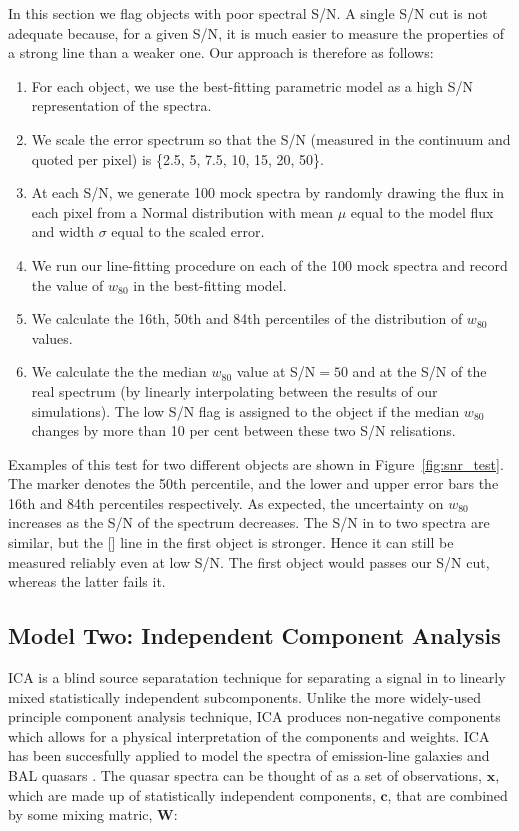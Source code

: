 In this section we flag objects with poor spectral \ac{S/N}. 
A single \ac{S/N} cut is not adequate because, for a given \ac{S/N}, it is much easier to measure the properties of a strong line than a weaker one. 
Our approach is therefore as follows:

\begin{enumerate}
\item For each object, we use the best-fitting parametric model as a high \ac{S/N} representation of the spectra. 
\item We scale the error spectrum so that the \ac{S/N} (measured in the continuum and quoted per pixel) is \{2.5, 5, 7.5, 10, 15, 20, 50\}.
\item At each \ac{S/N}, we generate 100 mock spectra by randomly drawing the flux in each pixel from a Normal distribution with mean $\mu$ equal to the model flux and width $\sigma$ equal to the scaled error. 
\item We run our line-fitting procedure on each of the 100 mock spectra and record the value of $w_{80}$ in the best-fitting model. 
\item We calculate the 16th, 50th and 84th percentiles of the distribution of $w_{80}$ values.
\item We calculate the the median $w_{80}$ value at \ac{S/N}$=50$ and at the \ac{S/N} of the real spectrum (by linearly interpolating between the results of our simulations). The low \ac{S/N} flag is assigned to the object if the median $w_{80}$ changes by more than 10 per cent between these two \ac{S/N} relisations. 
\end{enumerate}

Examples of this test for two different objects are shown in Figure~\ref{fig:snr_test}.
The marker denotes the 50th percentile, and the lower and upper error bars the 16th and 84th percentiles respectively. 
As expected, the uncertainty on $w_{80}$ increases as the \ac{S/N} of the spectrum decreases. 
The \ac{S/N} in to two spectra are similar, but the [] line in the  first object is stronger. 
Hence it can still be measured reliably even at low \ac{S/N}. 
The first object would passes our \ac{S/N} cut, whereas the latter fails it. 

\subsection{Model Two: Independent Component Analysis}

\ac{ICA} is a blind source separatation technique for separating a signal in to linearly mixed statistically independent subcomponents. 
Unlike the more widely-used principle component analysis technique, \ac{ICA} produces non-negative components which allows for a physical interpretation of the components and weights.  
\ac{ICA} has been succesfully applied to model the spectra of emission-line galaxies \citep{allen13} and BAL quasars \citep{allen11}. 
The quasar spectra can be thought of as a set of observations, $\bm{x}$, which are made up of statistically independent components, $\bm{c}$, that are combined by some mixing matric, $\bm{W}$:

